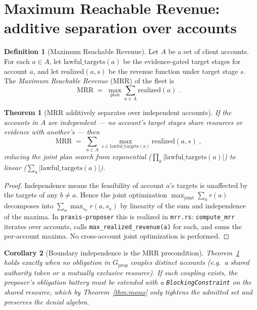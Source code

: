\documentclass[11pt,oneside]{book}
\theoremstyle{definition}
\newtheorem{definition}{Definition}[chapter]
\theoremstyle{plain}
\newtheorem{theorem}{Theorem}[chapter]
\newtheorem{corollary}[theorem]{Corollary}
\theoremstyle{remark}
\newcommand{\code}[1]{\texttt{#1}}
\begin{document}
\section{Maximum Reachable Revenue: additive separation over accounts}

\begin{definition}[Maximum Reachable Revenue]\label{def:mrr}
Let $A$ be a set of client accounts. For each $a\in A$, let
$\mathrm{lawful\_targets}(a)$ be the evidence-gated target stages for account $a$, and let
$\mathrm{realized}(a, s)$ be the revenue function under target stage $s$. The
\emph{Maximum Reachable Revenue} (MRR) of the fleet is
\[
\mathrm{MRR}\;=\;\max_{\text{plan}}\sum_{a\in A}\mathrm{realized}(a)\;.
\]
\end{definition}

\begin{theorem}[MRR additively separates over independent accounts]\label{thm:mrrsep}
If the accounts in $A$ are independent --- no account's target stages share resources or
evidence with another's --- then
\[
\mathrm{MRR}\;=\;\sum_{a\in A}\max_{s\in\mathrm{lawful\_targets}(a)}\mathrm{realized}(a,s)\;,
\]
reducing the joint plan search from exponential
($\prod_{a}|\mathrm{lawful\_targets}(a)|$) to linear
($\sum_{a}|\mathrm{lawful\_targets}(a)|$).
\end{theorem}

\begin{proof}
Independence means the feasibility of account $a$'s targets is unaffected by the targets
of any $b\neq a$. Hence the joint optimization $\max_{\text{joint}}\sum_a r(a)$ decomposes
into $\sum_a\max_{s_a} r(a, s_a)$ by linearity of the sum and independence of the maxima.
In \code{praxis-proposer} this is realized in \code{mrr.rs}: \code{compute\_mrr} iterates
over accounts, calls \code{max\_realized\_revenue(a)} for each, and sums the per-account
maxima. No cross-account joint optimization is performed.
\end{proof}

\begin{corollary}[Boundary independence is the MRR precondition]\label{cor:mrrindep}
Theorem~\ref{thm:mrrsep} holds exactly when no obligation in $G_{\mathrm{prop}}$ couples
distinct accounts (e.g.\ a shared authority token or a mutually exclusive resource). If
such coupling exists, the proposer's obligation battery must be extended with a
\code{BlockingConstraint} on the shared resource, which by Theorem~\ref{thm:mono} only
tightens the admitted set and preserves the denial algebra.
\end{corollary}
\end{document}
